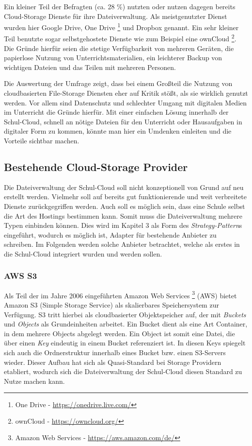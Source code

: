 Ein kleiner Teil der Befragten (ca. 28 \%) nutzten oder nutzen dagegen bereits Cloud-Storage Dienste für ihre Dateiverwaltung. Als meistgenutzter Dienst wurden hier Google Drive, One Drive  \footnote{One Drive - \url{https://onedrive.live.com/}} und Dropbox genannt. Ein sehr kleiner Teil benutzte sogar selbstgehostete Dienste wie zum Beispiel eine ownCloud \footnote{ownCloud - \url{https://owncloud.org/}}. Die Gründe hierfür seien die stetige Verfügbarkeit von mehreren Geräten, die papierlose Nutzung von Unterrichtsmaterialien, ein leichterer Backup von wichtigen Dateien und das Teilen mit mehreren Personen. 

Die Auswertung der Umfrage zeigt, dass bei einem Großteil die Nutzung von cloudbasierten File-Storage Diensten eher auf Kritik stößt, als sie wirklich genutzt werden. Vor allem sind Datenschutz und schlechter Umgang mit digitalen Medien im Unterricht die Gründe hierfür. Mit einer einfachen Lösung innerhalb der Schul-Cloud, schnell an nötige Dateien für den Unterricht oder Hausaufgaben in digitaler Form zu kommen, könnte man hier ein Umdenken einleiten und die Vorteile sichtbar machen.

\subsection{Bestehende Cloud-Storage Provider}

Die Dateiverwaltung der Schul-Cloud soll nicht konzeptionell von Grund auf neu erstellt werden. Vielmehr soll auf bereits gut funktionierende und weit verbreitete Dienste zurückgegriffen werden. Auch soll es möglich sein, dass eine Schule selbst die Art des Hostings bestimmen kann. Somit muss die Dateiverwaltung mehrere Typen einbinden können. Dies wird im Kapitel 3 als Form des \textit{Strategy-Pattern}s eingeführt, wodurch es möglich ist, Adapter für bestehende Anbieter zu schreiben. Im Folgenden werden solche Anbieter betrachtet, welche als erstes in die Schul-Cloud integriert wurden und werden sollen.

\subsubsection{AWS S3}
\label{sec:awss3related}

Als Teil der im Jahre 2006 eingeführten Amazon Web Services \footnote{Amazon Web Services - \url{https://aws.amazon.com/de/}} (AWS) bietet Amazon S3 (Simple Storage Service) als skalierbares Speichersystem zur Verfügung. S3 tritt hierbei als cloudbasierter Objektspeicher auf, der mit \textit{Buckets} und \textit{Objects} als Grundeinheiten arbeitet. Ein Bucket dient als eine Art Container, in dem mehrere Objects abgelegt werden. Ein Object ist somit eine Datei, die über einen \textit{Key} eindeutig in einem Bucket referenziert ist. In diesen Keys spiegelt sich auch die Ordnerstruktur innerhalb eines Bucket bzw. einen S3-Servers wieder. Dieser Aufbau hat sich als Quasi-Standard bei Storage Providern etabliert, wodurch sich die Dateiverwaltung der Schul-Cloud diesen Standard zu Nutze machen kann.

